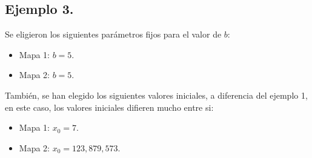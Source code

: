 \documentclass[10pt]{IEEEtran}
\begin{document}
\subsection{Ejemplo 3.}
Se eligieron los siguientes parámetros fijos para el valor de $b$:

\begin{itemize}
\item Mapa 1: $b =  5$.
\item Mapa 2: $b =  5$.
\end{itemize}

También, se han elegido los siguientes valores iniciales, a diferencia del ejemplo 1, en este caso, los valores iniciales difieren mucho entre si:

\begin{itemize}
\item Mapa 1: $x_{0} = 7$.
\item Mapa 2: $x_{0} =123,879,573$.
\end{itemize}
\end{document}
